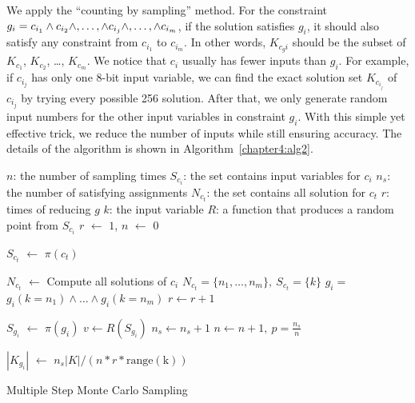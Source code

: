 We apply the ``counting by sampling'' method. For
the constraint $g_{i}= c_{i_1} \land c_{i_2} \land ,\ldots, \land c_{i_j}\\ \land ,\ldots, \land c_{i_m}$, if the solution satisfies $g_{i}$, it should also
satisfy any constraint from $c_{i_1}$ to $c_{i_m}$. In other words, $K_{c_gi}$
should be the subset of $K_{c_1}$, $K_{c_2}$, \ldots , $K_{c_m}$. We notice that
$c_i$ usually has fewer inputs than $g_{i}$. For example, if
$c_{i_j}$ has only one 8-bit input variable, we can find the exact solution set
$K_{c_{i_j}}$ of $c_{i_j}$ by trying every possible 256 solution. After that,
we only generate random input numbers for the other input variables in
constraint $g_{i}$. With this simple yet effective trick, we reduce the number of inputs while still ensuring accuracy. The details of the algorithm is shown in Algorithm~\ref{chapter4:alg2}.


\IncMargin{1em}
\begin{algorithm}\normalsize
    \SetAlgoLined
    \DontPrintSemicolon


    $n$: the number of sampling times \;
    $S_{c_i}$: the set contains input variables for $c_{i}$ \;
    $n_{s}$: the number of satisfying assignments \;
    $N_{c_t}$: the set contains all solution for $c_t$ \;
    $r$: times of reducing $g$\;
    $k$: the input variable \;
    $R$: a function that produces a random point from $S_{c_i}$\;
    $r$ $\leftarrow$ $1$,
    $n$ $\leftarrow$ $0$ \;
     {
    $S_{c_t}$ $\leftarrow$ $\pi(c_t)$ \;
    {
    $N_{c_t}$ $\leftarrow$ Compute all solutions of $c_i$ \;
    $N_{c_t} = \{n_1, \ldots, n_m\},\ S_{c_t} = \{k\}  $ \;
    $g_{i} = $ $g_i(k=n_1) \land \ldots \land g_i(k=n_m)$ \;
    $r \leftarrow r+1$ \;

    }
    }
     {
        $S_{g_i}$ $\leftarrow$ $\pi(g_i)$ \;
        $v \leftarrow R(S_{g_i})$ \;
        {
            $n_s \leftarrow n_s + 1$
        }
        $n \leftarrow n +1,\ p = \frac{n_s}{n}$
    }

    $|K_{g_{i}}|$ $\leftarrow$ $n_s|K| / (n * r * \mathrm{range(k)})$
    \caption{Multiple Step Monte Carlo Sampling}\label{chapter4:alg2}
\end{algorithm}
\DecMargin{1em}

